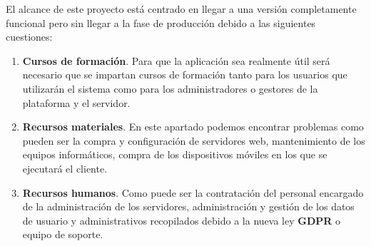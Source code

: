 El alcance de este proyecto está centrado en llegar a una versión completamente funcional
pero sin llegar a la fase de producción debido a las siguientes cuestiones:

\begin{enumerate}
    \item \textbf{Cursos de formación}. Para que la aplicación sea realmente útil será necesario
    que se impartan cursos de formación tanto para los usuarios que utilizarán el sistema
    como para los administradores o gestores de la plataforma y el servidor.

    \item \textbf{Recursos materiales}. En este apartado podemos encontrar problemas como pueden
    ser la compra y configuración de servidores web, mantenimiento de los equipos informáticos, 
    compra de los dispositivos móviles en los que se ejecutará el cliente.
    
    \item \textbf{Recursos humanos}. Como puede ser la contratación del personal encargado
    de la administración de los servidores, administración y gestión de los datos de usuario 
    y administrativos recopilados debido a la nueva ley \textbf{GDPR} o equipo de soporte.

\end{enumerate}
